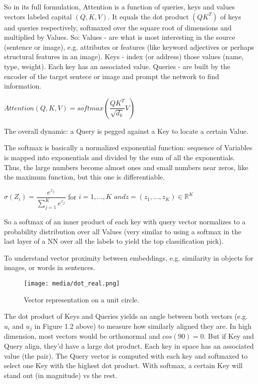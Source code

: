 So in its full formulation, Attention is a function of queries, keys and values 
vectors labeled capital $(Q,K,V)$. 
It equals the dot product $(QK^T)$ of keys and queries respectively, softmaxed over 
the square root of dimensions and multiplied by Values.
So:
Values - are what is most interesting in the source (sentence or image), 
e.g. attributes or features (like keyword adjectives or perhaps structural 
features in an image).
Keys - index (or address) those values (name, type, weight). Each key has an 
associated value. Queries - are built by the encoder of the target sentece or 
image and prompt the network to find information. 

\begin{center}
	$ Attention(Q, K, V) = softmax(\dfrac{QK^T}{\sqrt{d_k}} V ) $
	\end{center}

The overall dynamic: a Query is pegged against a Key to locate a certain Value.	

The softmax is basically a normalized exponential function: sequence of Variables is 
mapped into exponentials and divided by the sum of all the exponentials. Thus, the 
large numbers become almost ones and small numbers near zeros, like the maximum 
function, but this one is differentiable. 

\begin{center}
	$ \displaystyle\sigma(Z_i) = \dfrac{e^{z_j}}{\sum_{j=1}^K e^{z_j}}$ for $i=1,...,K$ $and z=(z_1,...,z_K) \in \mathbb{R}^K $
	\end{center}

So a softmax of an inner product of each key with query vector normalizes to a 
probability distribution over all Values (very similar to using a softmax in the last 
layer of a NN over all the labels to yield the top classification pick). 


To understand vector proximity between embeddings, e.g. similarity in objects for images, or words in sentences.

\begin{figure}[H]
	\begin{center}
	\texttt{[image: media/dot\_real.png]}
	\end{center}
	\caption[Vector Representation]{Vector representation on a unit circle.}
	\end{figure}

The dot product of Keys and Queries yields an angle between both vectors (e.g. $u_i$ and $u_j$ in Figure 1.2 above) to measure 
how similarly aligned they are. In high dimension, most vectors would be orthonormal 
and $cos(90)=0$. But if Key and Query align, they'd have a large dot product. 
Each key in space has an associated value (the pair). The Query vector is computed with 
each key and softmaxed to select one Key with the highest dot product. With softmax, 
a certain Key will stand out (in magnitude) vs the rest.

